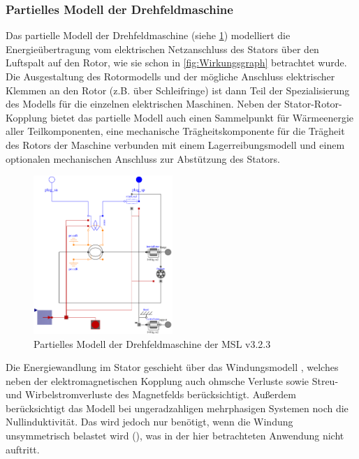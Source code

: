 \subsubsection{Partielles Modell der Drehfeldmaschine}\label{sec:partielles-modell-der-drehfeldmaschine}
Das partielle Modell der Drehfeldmaschine (siehe \cref{fig:partiellDrehfeldmaschinen}) modelliert die Energieübertragung vom elektrischen Netzanschluss des Stators über den Luftspalt auf den Rotor, wie sie schon in \cref{fig:Wirkungsgraph} betrachtet wurde. Die Ausgestaltung des Rotormodells und der mögliche Anschluss elektrischer Klemmen an den Rotor (z.B. über Schleifringe) ist dann Teil der Spezialisierung des Modells für die einzelnen elektrischen Maschinen. Neben der Stator-Rotor-Kopplung bietet das partielle Modell auch einen Sammelpunkt für Wärmeenergie aller Teilkomponenten, eine mechanische Trägheitskomponente für die Trägheit des Rotors der Maschine verbunden mit einem Lagerreibungsmodell und einem optionalen mechanischen Anschluss zur Abstützung des Stators.

\begin{figure}
\centering
\includegraphics[height=6cm]{Bilder/PartialBasicInductionMachine.pdf}
\caption{Partielles Modell der Drehfeldmaschine  der MSL v3.2.3}
\label{fig:partiellDrehfeldmaschinen}
\end{figure}

Die Energiewandlung im Stator geschieht über das Windungsmodell , welches neben der elektro\-mag\-ne\-ti\-schen Kopplung auch ohmsche Verluste sowie Streu- und Wirbelstromverluste des Magnetfelds berücksichtigt. Außerdem berücksichtigt das Modell  bei ungeradzahligen mehrphasigen Systemen noch die Nullinduktivität. Das wird jedoch nur benötigt, wenn die Windung unsymmetrisch belastet wird (\cite[S. 193]{kralModelicaObjektorientierteModellbildung2019}), was in der hier betrachteten Anwendung nicht auftritt.

